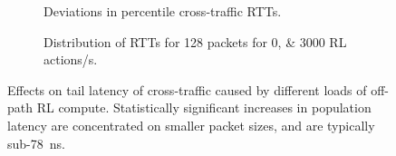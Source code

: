 \documentclass[
sigconf,natbib=false
]{acmart}
\begin{document}
\begin{figure}
	\centering
	\begin{subfigure}{0.45\linewidth}
		\caption{Deviations in  percentile cross-traffic RTTs.\label{fig:dataplane-heat}}
	\end{subfigure}
	\hspace{0.05\linewidth}
		\begin{subfigure}{0.45\linewidth}
		\caption{Distribution of RTTs for \SI{128}{\byte} packets for \numlist{0;3000} RL actions/s.\label{fig:dataplane-example}}
	\end{subfigure}
	\caption{Effects on tail latency of cross-traffic caused by different loads of off-path RL compute. Statistically significant increases in population latency are concentrated on smaller packet sizes, and are typically sub-\SI{78}{\nano\second}.\label{fig:dataplane-coop}}
\end{figure}
\end{document}
